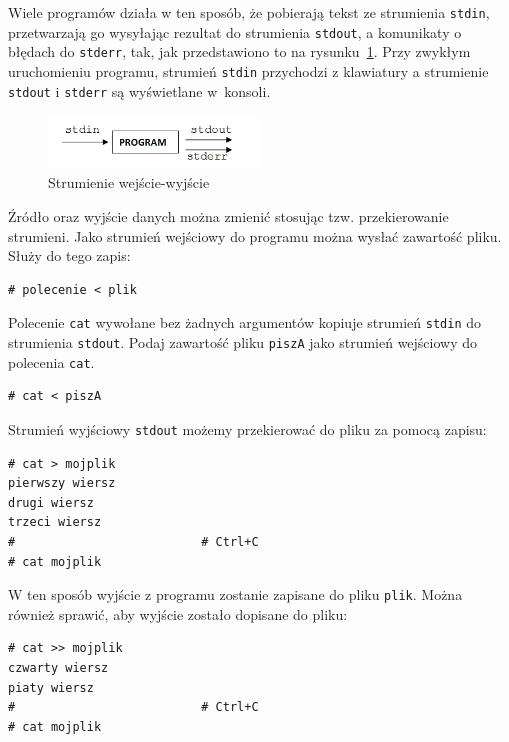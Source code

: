 Wiele programów działa w ten sposób, że pobierają tekst ze strumienia \lstinline[style=MyBashStyle]{stdin}, przetwarzają go wysyłając rezultat do strumienia \lstinline[style=MyBashStyle]{stdout}, a komunikaty o błędach do \lstinline[style=MyBashStyle]{stderr}, tak, jak przedstawiono to na rysunku~\ref{fig:strumienie}. Przy zwykłym uruchomieniu programu, strumień \lstinline[style=MyBashStyle]{stdin} przychodzi z klawiatury a strumienie \lstinline[style=MyBashStyle]{stdout} i \lstinline[style=MyBashStyle]{stderr} są wyświetlane w~konsoli. 

\begin{figure}[!h]
\centering
\includegraphics[width=0.5\textwidth]{img/strumienie}
\caption{Strumienie wejście-wyjście}
\label{fig:strumienie}
\end{figure}

Źródło oraz wyjście danych można zmienić stosując tzw. przekierowanie strumieni. Jako strumień wejściowy do programu można wysłać zawartość pliku. Służy do tego zapis:

\begin{lstlisting}[style=MyBashStyle] 
# polecenie < plik
\end{lstlisting} 

 
\begin{example} 

Polecenie \lstinline[style=MyBashStyle]{cat} wywołane bez żadnych argumentów kopiuje strumień \lstinline[style=MyBashStyle]{stdin} do strumienia \lstinline[style=MyBashStyle]{stdout}. Podaj zawartość pliku \lstinline[style=MyBashStyle]{piszA} jako strumień wejściowy do polecenia \lstinline[style=MyBashStyle]{cat}. 

\begin{lstlisting}[style=MyBashStyle] 
# cat < piszA
\end{lstlisting} 

Strumień wyjściowy \lstinline[style=MyBashStyle]{stdout} możemy przekierować do pliku za pomocą zapisu:

\begin{lstlisting}[style=MyBashStyle] 
# cat > mojplik
pierwszy wiersz
drugi wiersz
trzeci wiersz 
#                          # Ctrl+C
# cat mojplik
\end{lstlisting} 

W ten sposób wyjście z programu zostanie zapisane do pliku \lstinline[style=MyBashStyle]{plik}. Można również sprawić, aby wyjście zostało dopisane do pliku: 

\begin{lstlisting}[style=MyBashStyle] 
# cat >> mojplik
czwarty wiersz
piaty wiersz
#                          # Ctrl+C
# cat mojplik
\end{lstlisting} 
\end{example} 


